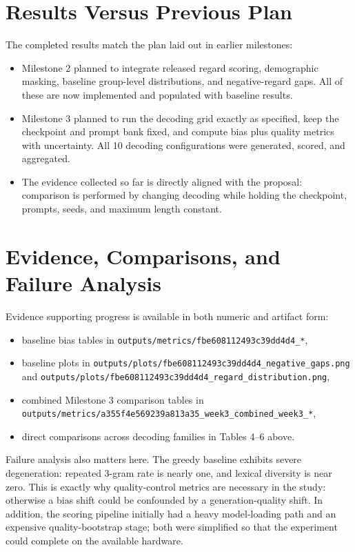 \documentclass[11pt]{article}
\begin{document}
\section{Results Versus Previous Plan}
The completed results match the plan laid out in earlier milestones:
\begin{itemize}
\item Milestone 2 planned to integrate released regard scoring, demographic masking,
      baseline group-level distributions, and negative-regard gaps. All of these
      are now implemented and populated with baseline results.
\item Milestone 3 planned to run the decoding grid exactly as specified, keep the
      checkpoint and prompt bank fixed, and compute bias plus quality metrics
      with uncertainty. All 10 decoding configurations were generated, scored,
      and aggregated.
\item The evidence collected so far is directly aligned with the proposal:
      comparison is performed by changing decoding while holding the checkpoint,
      prompts, seeds, and maximum length constant.
\end{itemize}

\section{Evidence, Comparisons, and Failure Analysis}
Evidence supporting progress is available in both numeric and artifact form:
\begin{itemize}
\item baseline bias tables in \texttt{outputs/metrics/fbe608112493c39dd4d4\_*},
\item baseline plots in \texttt{outputs/plots/fbe608112493c39dd4d4\_negative\_gaps.png}
      and \texttt{outputs/plots/fbe608112493c39dd4d4\_regard\_distribution.png},
\item combined Milestone 3 comparison tables in
      \texttt{outputs/metrics/a355f4e569239a813a35\_week3\_combined\_week3\_*},
\item direct comparisons across decoding families in Tables 4--6 above.
\end{itemize}

Failure analysis also matters here. The greedy baseline exhibits severe
degeneration: repeated 3-gram rate is nearly one, and lexical diversity is near
zero. This is exactly why quality-control metrics are necessary in the study:
otherwise a bias shift could be confounded by a generation-quality shift. In
addition, the scoring pipeline initially had a heavy model-loading path and an
expensive quality-bootstrap stage; both were simplified so that the experiment
could complete on the available hardware.
\end{document}
